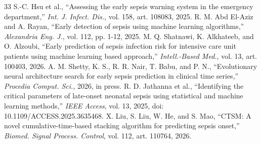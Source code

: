 \documentclass[conference]{IEEEtran}
\begin{document}
\begin{thebibliography}{33}
 S.-C. Hsu et al., ``Assessing the early sepsis warning system in the emergency department,'' \emph{Int. J. Infect. Dis.}, vol. 158, art. 108083, 2025.
 R. M. Abd El-Aziz and A. Rayan, ``Early detection of sepsis using machine learning algorithms,'' \emph{Alexandria Eng. J.}, vol. 112, pp. 1-12, 2025.
 M. Q. Shatnawi, K. Alkhateeb, and O. Alzoubi, ``Early prediction of sepsis infection risk for intensive care unit patients using machine learning based approach,'' \emph{Intell.-Based Med.}, vol. 13, art. 100403, 2026.
 A. M. Shetty, K. S., R. R. Nair, T. Babu, and P. N., ``Evolutionary neural architecture search for early sepsis prediction in clinical time series,'' \emph{Procedia Comput. Sci.}, 2026, in press.
 R. D. Jathanna et al., ``Identifying the critical parameters of late-onset neonatal sepsis using statistical and machine learning methods,'' \emph{IEEE Access}, vol. 13, 2025, doi: 10.1109/ACCESS.2025.3635468.
 X. Liu, S. Liu, W. He, and S. Mao, ``CTSM: A novel cumulative-time-based stacking algorithm for predicting sepsis onset,'' \emph{Biomed. Signal Process. Control}, vol. 112, art. 110764, 2026.

\end{thebibliography}
\end{document}
